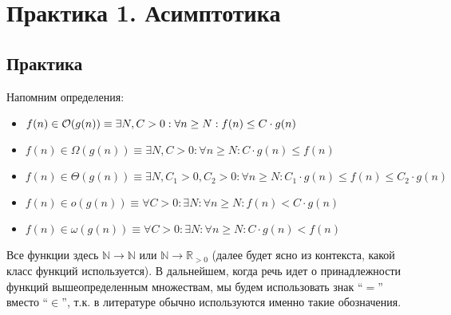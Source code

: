 \section{Практика 1. Асимптотика}

\subsection{Практика}

Напомним определения:
\begin{itemize}
  \item $f(n) \in \mathcal{O}(g(n))     \equiv \exists N, C > 0 : \forall n \ge N : f(n) \le C \cdot g(n)$
  \item $f(n) \in \Omega(g(n)) \equiv \exists N, C > 0 : \forall n \ge N : C \cdot g(n) \le f(n)$
  \item $f(n) \in \Theta(g(n)) \equiv \exists N, C_1 > 0, C_2 > 0 : \forall n \ge N : C_1 \cdot g(n) \le f(n) \le C_2 \cdot g(n)$
  \item $f(n) \in o(g(n))      \equiv \forall C > 0 : \exists N : \forall n \ge N : f(n) < C \cdot g(n)$
  \item $f(n) \in \omega(g(n)) \equiv \forall C > 0 : \exists N : \forall n \ge N : C \cdot g(n) < f(n)$
\end{itemize}
Все функции здесь $\mathbb{N} \to \mathbb{N}$ или $\mathbb{N} \to \mathbb{R}_{>0}$ (далее будет
ясно из контекста, какой класс функций используется). В дальнейшем, когда речь
идет о принадлежности функций вышеопределенным множествам,
мы будем использовать знак ``$=$'' вместо ``$\in$'', т.к. в литературе
обычно используются именно такие обозначения.

